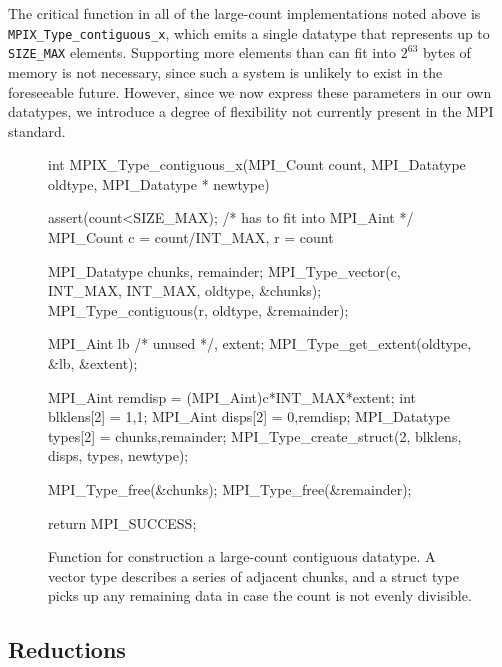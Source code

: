 The critical function in all of the large-count implementations noted above
is \texttt{MPIX\_Type\_contiguous\_x}, which emits a single datatype that
represents up to \texttt{SIZE\_MAX} elements.
Supporting more elements than can fit into $2^{63}$ bytes of memory is
not necessary, since such a system is unlikely to exist in the foreseeable future.
However, since we now express these parameters in our own datatypes, we introduce
a degree of flexibility not currently present in the MPI standard.



\begin{figure}
\begin{code}
int MPIX_Type_contiguous_x(MPI_Count count, 
                           MPI_Datatype oldtype, 
                           MPI_Datatype * newtype)
{
    assert(count<SIZE_MAX); /* has to fit into MPI_Aint */
    MPI_Count c = count/INT_MAX, r = count%

    MPI_Datatype chunks, remainder;
    MPI_Type_vector(c, INT_MAX, INT_MAX, oldtype, &chunks);
    MPI_Type_contiguous(r, oldtype, &remainder);

    MPI_Aint lb /* unused */, extent;
    MPI_Type_get_extent(oldtype, &lb, &extent);

    MPI_Aint remdisp          = (MPI_Aint)c*INT_MAX*extent;
    int blklens[2]            = {1,1};
    MPI_Aint disps[2]         = {0,remdisp};
    MPI_Datatype types[2]     = {chunks,remainder};
    MPI_Type_create_struct(2, blklens, disps, types, newtype);

    MPI_Type_free(&chunks);
    MPI_Type_free(&remainder);

    return MPI_SUCCESS;
}
\end{code}
\label{code:type_contig_x}
\caption{Function for construction a large-count contiguous datatype.
A vector type describes a series of adjacent chunks, and a struct type picks up
any remaining data in case the count is not evenly divisible.}
\end{figure}



\subsection{Reductions}
\label{sec:reductions}

